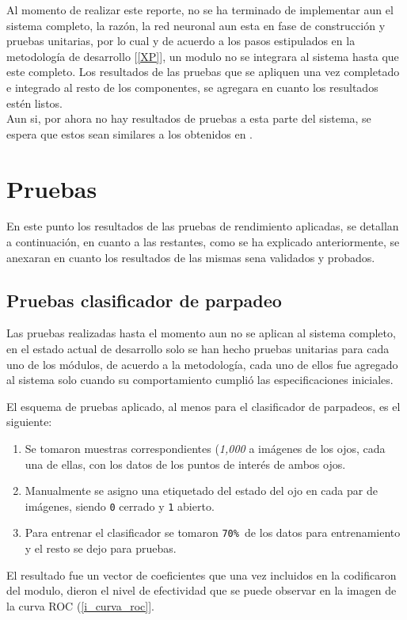 \documentclass[12pt]{book} %
\begin{document}
	Al momento de realizar este reporte, no se ha terminado de implementar aun el sistema completo, la razón, la red neuronal aun
	esta en fase de construcción y pruebas unitarias, por lo cual y de acuerdo a los pasos estipulados en la metodología de  desarrollo [\ref{XP}],
	un modulo no se integrara al sistema hasta que este completo.
	Los resultados de las pruebas que se apliquen una vez completado e integrado al resto de los componentes, se agregara en cuanto los 
	resultados estén listos.\\
	Aun si, por ahora no hay resultados de pruebas a esta parte del sistema, se espera que estos sean similares a los obtenidos en \cite{Sugano}.
	


\section{Pruebas}
	En este punto los resultados de las pruebas de rendimiento aplicadas, se detallan a continuación, en cuanto a las restantes, como se ha
	explicado anteriormente, se anexaran en cuanto los resultados de las mismas sena validados y probados.
	
	\subsection{Pruebas clasificador de parpadeo}
	
		Las pruebas realizadas hasta el momento aun no se aplican al sistema completo, en el estado actual de desarrollo solo se han hecho pruebas
		unitarias para cada uno de los módulos, de acuerdo a la metodología, cada uno de ellos fue agregado al sistema solo cuando su comportamiento 
		cumplió las  especificaciones iniciales.
		
		El esquema de pruebas aplicado, al menos para el clasificador de parpadeos, es el siguiente:
		\begin{multicols}{2}
			\begin{enumerate}
				\item Se tomaron muestras correspondientes (\textit{1,000} a imágenes de los ojos, cada una de ellas, con los datos de los puntos
					de interés de ambos ojos. 
				\item Manualmente se asigno una etiquetado del estado del ojo en cada par de imágenes, siendo \texttt{0} cerrado y \texttt{1} abierto.
				\item Para entrenar el clasificador se tomaron \texttt{70\% }de los datos para entrenamiento y el resto se dejo para pruebas.
			\end{enumerate}
		\end{multicols}
		El resultado fue un vector de coeficientes que una vez incluidos en la codificaron del modulo, dieron el nivel de efectividad que se puede 
		observar  en la imagen de la curva ROC (\ref{i_curva_roc}].
		
\end{document}
